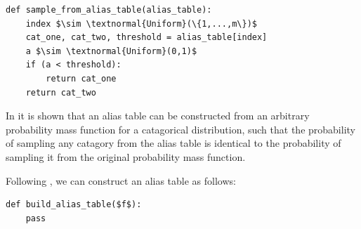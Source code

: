     \begin{lstlisting}
def sample_from_alias_table(alias_table):
    index $\sim \textnormal{Uniform}(\{1,...,m\})$
    cat_one, cat_two, threshold = alias_table[index]
    a $\sim \textnormal{Uniform}(0,1)$
    if (a < threshold):
        return cat_one 
    return cat_two
    \end{lstlisting}

    In  it is shown  that an alias table can be constructed from an arbitrary probability mass function for a catagorical distribution, such that the probability of sampling any catagory from the alias table is identical to the probability of sampling it from the original probability mass function. 
    

    Following , we can construct an alias table as follows:

    \begin{lstlisting}
def build_alias_table($f$):
    pass
\end{lstlisting}











    
    












